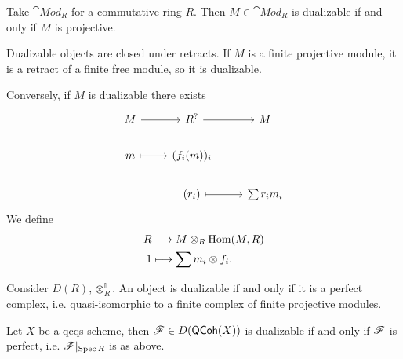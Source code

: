 \begin{example}
	Take $\cat{Mod}_R$ for a commutative ring $R$. Then $M\in \cat{Mod}_R$ is dualizable if and only if $M$ is projective.

	Dualizable objects are closed under retracts. If $M$ is a finite projective module, it is a retract of a finite free module, so it is dualizable.

	Conversely, if $M$ is dualizable there exists
	\begin{equation}
	\begin{tikzcd}
		M \ar[r] & R^{?} \ar[r] & M \\
		m \ar[r,mapsto] & (f_i(m))_i \\
				& (r_i) \ar[r, mapsto] & \sum r_im_i 
	\end{tikzcd}
	\end{equation}
	We define
	\begin{align*}
		R &\longrightarrow M\otimes_R \operatorname{Hom}(M,R) \\
		1 &\longmapsto \sum m_i\otimes f_i
	.\end{align*}
\end{example}
\begin{example}
	Consider $D(R),\otimes_R^{\mathbb{L}}$. An object is dualizable if and only if it is a perfect complex, i.e. quasi-isomorphic to a finite complex of finite projective modules.
\end{example}
\begin{example}
	Let $X$ be a qcqs scheme, then $\mathscr{F}\in D(\mathsf{QCoh}(X))$ is dualizable if and only if $\mathscr{F}$ is perfect, i.e. $\mathscr{F}|_{\operatorname{Spec} R}$ is as above.
\end{example}
